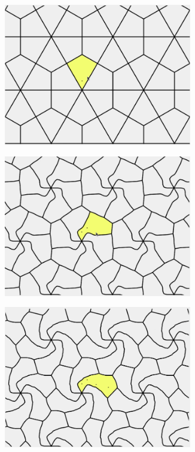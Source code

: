 \documentclass[11pt]{article}
\begin{document}
\begin{figure}[H]

  \begin{subfigure}[b]{0.33\textwidth}
    \includegraphics[width=0.9\textwidth]{sl1.png}

  \end{subfigure}
  \begin{subfigure}[b]{0.33\textwidth}
    \includegraphics[width=0.9\textwidth]{sl2.png}

  \end{subfigure}
  \begin{subfigure}[b]{0.33\textwidth}
    \includegraphics[width=0.9\textwidth]{sl6.png}


\end{subfigure}
\end{figure}
\end{document}
